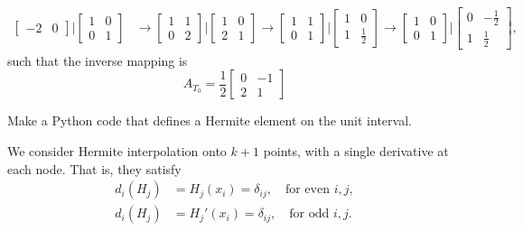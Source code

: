 \begin{solution}
\begin{align*}
\begin{bmatrix}
            -2 & 0
        \end{bmatrix} \Big\vert
        \begin{bmatrix}
            1 & 0 \\
            0 & 1
        \end{bmatrix}
        &\rightarrow
        \begin{bmatrix}
            1 & 1 \\
            0 & 2
        \end{bmatrix} \Big\vert
        \begin{bmatrix}
            1 & 0 \\
            2 & 1
        \end{bmatrix}
        \rightarrow
        \begin{bmatrix}
            1 & 1 \\
            0 & 1
        \end{bmatrix} \Big\vert
        \begin{bmatrix}
            1 & 0 \\
            1 & \frac{1}{2}
        \end{bmatrix}
        \rightarrow
        \begin{bmatrix}
            1 & 0 \\
            0 & 1
        \end{bmatrix} \Big\vert
        \begin{bmatrix}
            0 & -\frac{1}{2} \\
            1 & \frac{1}{2}
        \end{bmatrix},
    \end{align*}
    such that the inverse mapping is
    \begin{equation*}
        A_{T_0} = \frac{1}{2}
        \begin{bmatrix}
            0 & -1 \\
            2 & 1
        \end{bmatrix}
    \end{equation*}
\end{solution}

\begin{exercise}
    Make a Python code that defines a Hermite element on the unit interval.
\end{exercise}

\begin{solution}
    We consider Hermite interpolation onto $k + 1$ points, with a single derivative at each node.
    That is, they satisfy
    \begin{equation}
        \begin{split}
            d_i(H_j) &= H_j(x_i) = \delta_{ij}, \quad \text{for even } i, j, \\
            d_i(H_j) &= H_j'(x_i) = \delta_{ij}, \quad \text{for odd } i, j.
        \end{split}
    \end{equation}
\end{solution}
